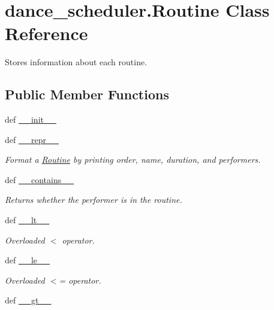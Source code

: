 \hypertarget{classdance__scheduler_1_1Routine}{\section{dance\-\_\-scheduler.\-Routine Class Reference}
\label{classdance__scheduler_1_1Routine}
}


Stores information about each routine.  


\subsection*{Public Member Functions}
\begin{DoxyCompactItemize}
\item 
def \hyperlink{classdance__scheduler_1_1Routine_a08301765bb98ffbb23b31aac4bc28580}{\-\_\-\-\_\-init\-\_\-\-\_\-}
\item 
def \hyperlink{classdance__scheduler_1_1Routine_a0b14091ce7c687c3af659e5777266fee}{\-\_\-\-\_\-repr\-\_\-\-\_\-}
\begin{DoxyCompactList}\small\item\em Format a \hyperlink{classdance__scheduler_1_1Routine}{Routine} by printing order, name, duration, and performers. \end{DoxyCompactList}\item 
def \hyperlink{classdance__scheduler_1_1Routine_a4616bcb1f5d1bba69819186e847d519c}{\-\_\-\-\_\-contains\-\_\-\-\_\-}
\begin{DoxyCompactList}\small\item\em Returns whether the performer is in the routine. \end{DoxyCompactList}\item 
def \hyperlink{classdance__scheduler_1_1Routine_a7838539cdfb72608d391bfc7bfb1da08}{\-\_\-\-\_\-lt\-\_\-\-\_\-}
\begin{DoxyCompactList}\small\item\em Overloaded $<$ operator. \end{DoxyCompactList}\item 
def \hyperlink{classdance__scheduler_1_1Routine_a07fb060a00d33c365ac89fc5c4519546}{\-\_\-\-\_\-le\-\_\-\-\_\-}
\begin{DoxyCompactList}\small\item\em Overloaded $<$= operator. \end{DoxyCompactList}\item 
def \hyperlink{classdance__scheduler_1_1Routine_acbfffda403d64937b85414e70d2559c2}{\-\_\-\-\_\-gt\-\_\-\-\_\-}

\end{DoxyCompactItemize}
